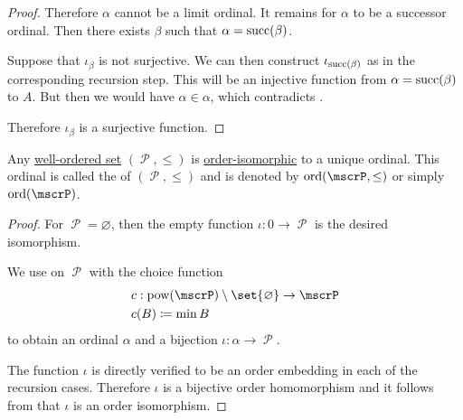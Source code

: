 \begin{proof}
  Therefore \( \alpha \) cannot be a limit ordinal. It remains for \( \alpha \) to be a successor ordinal. Then there exists \( \beta \) such that \( \alpha = \operatorname{succ}(\beta) \).

  Suppose that \( \iota_\beta \) is not surjective. We can then construct \( \iota_{\operatorname{succ}(\beta)} \) as in the corresponding recursion step. This will be an injective function from \( \alpha = \operatorname{succ}(\beta) \) to \( A \). But then we would have \( \alpha \in \alpha \), which contradicts .

  Therefore \( \iota_\beta \) is a surjective function.
\end{proof}

\begin{theorem}\label{thm:well_ordered_order_type_existence}
  Any \hyperref[def:well_ordered_set]{well-ordered set} \( (\mscrP, \leq) \) is \hyperref[def:partially_ordered_set/homomorphism]{order-isomorphic} to a unique ordinal. This ordinal is called the  of \( (\mscrP, \leq) \) and is denoted by \( \ord(\mscrP, \leq) \) or simply \( \ord(\mscrP) \).
\end{theorem}
\begin{proof}
  For \( \mscrP = \varnothing \), then the empty function \( \iota: 0 \to \mscrP \) is the desired isomorphism.

  We use  on \( \mscrP \) with the choice function
  \begin{equation*}
    \begin{aligned}
      &c: \pow(\mscrP) \setminus \set{ \varnothing } \to \mscrP \\
      &c(B) \coloneqq \min B
    \end{aligned}
  \end{equation*}
  to obtain an ordinal \( \alpha \) and a bijection \( \iota: \alpha \to \mscrP \).

  The function \( \iota \) is directly verified to be an order embedding in each of the recursion cases. Therefore \( \iota \) is a bijective order homomorphism and it follows from  that \( \iota \) is an order isomorphism.
\end{proof}

